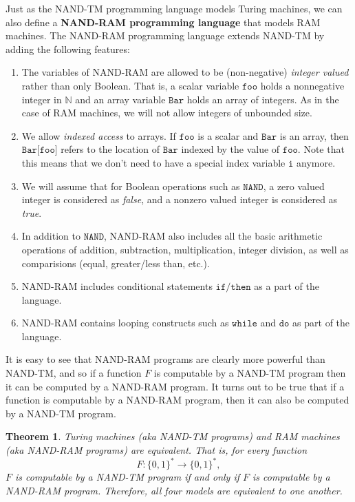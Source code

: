 \documentclass[a4paper, 12pt]{report}
\newtheorem{theorem}{Theorem}[section]
\theoremstyle{remark}
\theoremstyle{definition}
\begin{document}
Just as the NAND-TM programming language models Turing machines, we can also define a \textbf{NAND-RAM programming language} that models RAM machines. The NAND-RAM programming language extends NAND-TM by adding the following features: 
\begin{enumerate}
    \item The variables of NAND-RAM are allowed to be (non-negative) \textit{integer valued} rather than only Boolean. That is, a scalar variable $\texttt{foo}$ holds a nonnegative integer in $\mathbb{N}$ and an array variable $\texttt{Bar}$ holds an array of integers. As in the case of RAM machines, we will not allow integers of unbounded size. 
    \item We allow \textit{indexed access} to arrays. If $\texttt{foo}$ is a scalar and $\texttt{Bar}$ is an array, then $\texttt{Bar[foo]}$ refers to the location of $\texttt{Bar}$ indexed by the value of $\texttt{foo}$. Note that this means that we don't need to have a special index variable $\texttt{i}$ anymore. 
    \item We will assume that for Boolean operations such as $\texttt{NAND}$, a zero valued integer is considered as \textit{false}, and a nonzero valued integer is considered as \textit{true}. 
    \item In addition to $\texttt{NAND}$, NAND-RAM also includes all the basic arithmetic operations of addition, subtraction, multiplication, integer division, as well as comparisions (equal, greater/less than, etc.). 
    \item NAND-RAM includes conditional statements $\texttt{if/then}$ as a part of the language. 
    \item NAND-RAM contains looping constructs such as $\texttt{while}$ and $\texttt{do}$ as part of the language. 
\end{enumerate}

It is easy to see that NAND-RAM programs are clearly more powerful than NAND-TM, and so if a function $F$ is computable by a NAND-TM program then it can be computed by a NAND-RAM program. It turns out to be true that if a function is computable by a NAND-RAM program, then it can also be computed by a NAND-TM program. 

\begin{theorem}
Turing machines (aka NAND-TM programs) and RAM machines (aka NAND-RAM programs) are equivalent. That is, for every function 
\[F: \{0,1\}^* \longrightarrow \{0,1\}^* ,\]
$F$ is computable by a NAND-TM program if and only if $F$ is computable by a NAND-RAM program. Therefore, all four models are equivalent to one another. 
\end{theorem}
\end{document}
